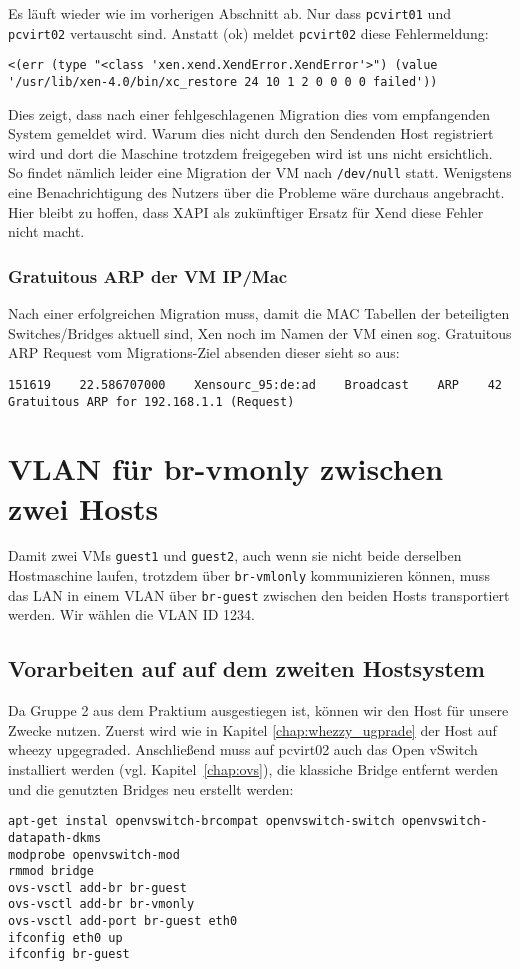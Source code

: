 Es läuft wieder wie im vorherigen Abschnitt ab. Nur dass \verb#pcvirt01# und \verb#pcvirt02# vertauscht sind. Anstatt (ok) meldet \verb#pcvirt02# diese Fehlermeldung:
\setupVerbatimOut
\begin{verbatim}
<(err (type "<class 'xen.xend.XendError.XendError'>") (value '/usr/lib/xen-4.0/bin/xc_restore 24 10 1 2 0 0 0 0 failed'))
\end{verbatim}

Dies zeigt, dass nach einer fehlgeschlagenen Migration dies vom empfangenden System gemeldet wird. Warum dies nicht durch den Sendenden Host registriert wird und dort die Maschine trotzdem freigegeben wird ist uns nicht ersichtlich. So findet nämlich leider eine Migration der VM nach \verb#/dev/null# statt. Wenigstens eine Benachrichtigung des Nutzers über die Probleme wäre durchaus angebracht. Hier bleibt zu hoffen, dass XAPI als zukünftiger Ersatz für Xend diese Fehler nicht macht.

\subsection{Gratuitous ARP der VM IP/Mac}

Nach einer erfolgreichen Migration muss, damit die MAC Tabellen der beteiligten Switches/Bridges aktuell sind, Xen noch im Namen der VM einen sog. Gratuitous ARP Request vom Migrations-Ziel absenden dieser sieht so aus:

\setupVerbatimOut
\begin{verbatim}
151619    22.586707000    Xensourc_95:de:ad    Broadcast    ARP    42    Gratuitous ARP for 192.168.1.1 (Request)
\end{verbatim}


\chapter{VLAN für br-vmonly zwischen zwei Hosts}

Damit zwei VMs \verb#guest1# und \verb#guest2#, auch wenn sie nicht beide derselben Hostmaschine laufen, trotzdem über \verb#br-vmlonly# kommunizieren können, muss das LAN in einem VLAN über \verb#br-guest# zwischen den beiden Hosts transportiert werden. Wir wählen die VLAN ID 1234.

\section {Vorarbeiten auf auf dem zweiten Hostsystem}\label{ovs2}
Da Gruppe 2 aus dem Praktium ausgestiegen ist, können wir den Host für unsere Zwecke nutzen. Zuerst wird wie in Kapitel \ref{chap:whezzy_ugprade} der Host auf wheezy upgegraded.
Anschließend muss auf pcvirt02 auch das Open vSwitch installiert werden (vgl. Kapitel~\ref{chap:ovs}), die klassiche Bridge entfernt werden und die genutzten Bridges neu erstellt werden:
\begin{verbatim}
apt-get instal openvswitch-brcompat openvswitch-switch openvswitch-datapath-dkms
modprobe openvswitch-mod
rmmod bridge
ovs-vsctl add-br br-guest
ovs-vsctl add-br br-vmonly
ovs-vsctl add-port br-guest eth0
ifconfig eth0 up
ifconfig br-guest
\end{verbatim}

